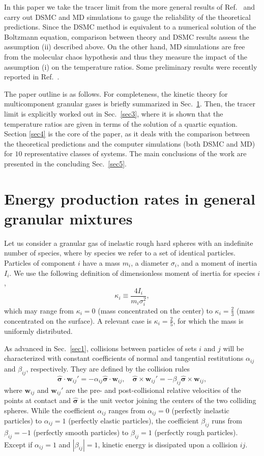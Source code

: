 \documentclass[aps,pre,reprint]{revtex4-1}
\newcommand\beq{\begin{equation}}
\newcommand\eeq{\end{equation}}
\newcommand{\ma}{m_i}
\newcommand{\kk}{\widehat{\bm{\sigma}}}
\newcommand{\Ia}{I_i}
\newcommand{\da}{\sigma_i}
\newcommand{\x}{\times}
\newcommand{\een}{\alpha_{ij}}
\newcommand{\eet}{\beta_{ij}}
\newcommand{\qa}{\kappa_{i}}
\newcommand{\wwwab}{\mathbf{w}_{ij}}
\begin{document}
In this paper we take the tracer limit from the more general results of Ref.\ \cite{SKG10} and carry out DSMC \cite{B94} and MD \cite{L91b} simulations to gauge the reliability of the theoretical predictions. Since the DSMC method is equivalent to a numerical solution of the Boltzmann equation, comparison between theory and DSMC results assess the assumption (ii)  described above. On the other hand, MD simulations are free from the molecular chaos hypothesis and thus they measure the impact of the assumption (i) on the temperature ratios. Some preliminary results were recently reported in Ref.\ \cite{VLSG17}.

The paper outline is as follows. For completeness, the kinetic theory for multicomponent granular gases is briefly summarized in Sec.\ \ref{sec2}. Then, the tracer limit is explicitly worked out in Sec.\ \ref{sec3}, where it is shown that the temperature ratios are given in terms of the solution of a quartic equation. Section \ref{sec4} is the core of the paper, as it deals with the comparison between the theoretical predictions and the computer simulations (both DSMC and MD) for $10$ representative classes of systems. The main conclusions of the work are presented in the concluding Sec.\ \ref{sec5}.

\section{Energy production rates in  general granular mixtures}
\label{sec2}

Let us consider a granular gas of inelastic rough hard spheres with an indefinite
number of species, where  by species we refer to a set of identical
particles. Particles of component $i$ have a mass $\ma$, a diameter $\da$, and a
moment of inertia $\Ia$. We use the following definition of dimensionless  moment of inertia  for species $i$,
\beq
\qa\equiv\frac{4\Ia}{\ma\da^2},
\label{kappa}
\eeq
which may range from $\qa=0$ (mass concentrated on the center) to $\qa=\frac{2}{3}$
(mass concentrated on the surface). A relevant case is $\qa=\frac{2}{5}$, for which the mass is uniformly distributed.

As advanced in Sec.\ \ref{sec1},  collisions between particles of sets $i$
and $j$ will be characterized with constant coefficients of normal and tangential restitutions $\een$ and $\eet$, respectively. They are defined by the collision rules
\beq
\kk\cdot \wwwab'=-\een \kk\cdot \wwwab,\quad \kk\x \wwwab'=-\eet \kk\x \wwwab,
\label{restitution}
\eeq
where $\wwwab$ and $\wwwab'$ are the pre- and post-collisional relative velocities of the points at contact and $\kk$ is the unit vector joining the centers of the two colliding spheres.
While the coefficient $\een$ ranges from $\een=0$ (perfectly inelastic particles) to $\een=1$ (perfectly elastic particles),  the coefficient $\eet$ runs from $\eet=-1$ (perfectly smooth particles) to $\eet=1$ (perfectly rough particles). Except if $\een=1$ and $|\eet|=1$, kinetic energy is dissipated upon a collision $ij$.
\end{document}
